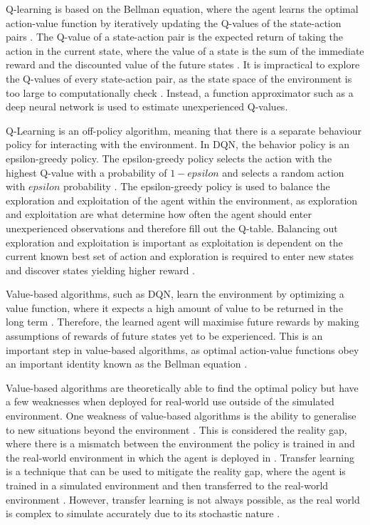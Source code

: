 Q-learning is based on the Bellman equation, where the agent learns the optimal action-value function by iteratively updating the Q-values of the state-action pairs \cite{mnih2013playing}. The Q-value of a state-action pair is the expected return of taking the action in the current state, where the value of a state is the sum of the immediate reward and the discounted value of the future states \cite{bellman1958dynamic}. It is impractical to explore the Q-values of every state-action pair, as the state space of the environment is too large to computationally check \cite{mnih2013playing}. Instead, a function approximator such as a deep neural network is used to estimate unexperienced Q-values. 

Q-Learning is an off-policy algorithm, meaning that there is a separate behaviour policy for interacting with the environment. In DQN, the behavior policy is an epsilon-greedy policy. The epsilon-greedy policy selects the action with the highest Q-value with a probability of $1 - epsilon$ and selects a random action with $epsilon$ probability \cite{TFAgentsAuthors2023}. The epsilon-greedy policy is used to balance the exploration and exploitation of the agent within the environment, as exploration and exploitation are what determine how often the agent should enter unexperienced observations and therefore fill out the Q-table. Balancing out exploration and exploitation is important as exploitation is dependent on the current known best set of action and exploration is required to enter new states and discover states yielding higher reward \cite{TFAgentsAuthors2023}.

Value-based algorithms, such as DQN, learn the environment by optimizing a value function, where it expects a high amount of value to be returned in the long term \cite{deepcheckRL}. Therefore, the learned agent will maximise future rewards by making assumptions of rewards of future states yet to be experienced. This is an important step in value-based algorithms, as optimal action-value functions obey an important identity known as the Bellman equation \cite{mnih2013playing}. 

Value-based algorithms are theoretically able to find the optimal policy but have a few weaknesses when deployed for real-world use outside of the simulated environment. One weakness of value-based algorithms is the ability to generalise to new situations beyond the environment \cite{OdelTruxillo2023}. This is considered the reality gap, where there is a mismatch between the environment the policy is trained in and the real-world environment in which the agent is deployed in \cite{tobin2017domain}. Transfer learning is a technique that can be used to mitigate the reality gap, where the agent is trained in a simulated environment and then transferred to the real-world environment \cite{OdelTruxillo2023}. However, transfer learning is not always possible, as the real world is complex to simulate accurately due to its stochastic nature \cite{OdelTruxillo2023}. 

